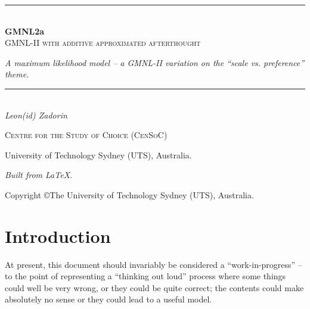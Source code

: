 \documentclass[12pt,a4paper]{article}
\begin{document}



\setlength{\parindent}{0pt}
\setlength{\parskip}{2ex}


\begin{titlepage}
\begin{center}



\vspace*{3cm}

\rule{\linewidth}{0.5mm} \\[0.4cm]
{ \huge \bfseries GMNL2a }\\[0.4cm]
{\large \textsc{GMNL-II with additive approximated afterthought}}

{\large \emph{A maximum likelihood model -- a GMNL-II variation on the ``scale vs. preference'' theme.}}
\rule{\linewidth}{0.5mm}
\\[1.1cm]
\large
\textit{Leon(id) Zadorin}
\vspace{3cm}

{\Large \textsc{Centre for the Study of Choice (CenSoC)}}

{\large University of Technology Sydney (UTS), Australia.}


\vfill

\emph{Built from \LaTeX.} \\ 

Copyright \copyright  \space   \the\year \space The University of Technology Sydney (UTS), Australia.

\end{center}

\end{titlepage}

\newpage
\tableofcontents
\newpage
\section{Introduction}

At present, this document should invariably be considered a ``work-in-progress'' -- to the point of representing a ``thinking out loud'' process where some things could well be very wrong, or they could be quite correct; the contents could make absolutely no sense or they could lead to a useful model.
\end{document}
